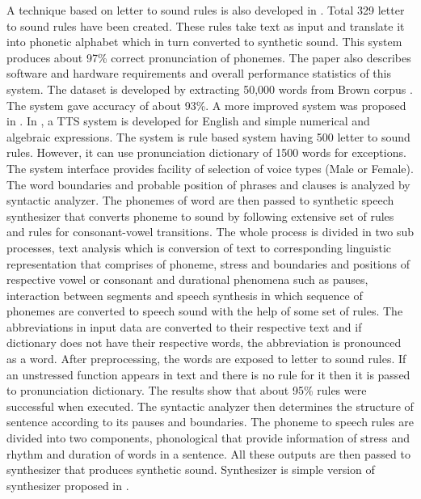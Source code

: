 A technique based on letter to sound rules is also developed in \cite{elovitz1976automatic}. Total 329 letter to sound rules have been created. These rules take text as input and translate it into phonetic alphabet which in turn converted to synthetic sound. This system produces about 97\% correct pronunciation of phonemes. The paper also describes software and hardware requirements and overall performance statistics of this system. The dataset is developed by extracting 50,000 words from Brown corpus \cite{ku1967computational}. The system gave accuracy of about 93\%. A more improved system was proposed in \cite{carlson1982multi, klatt1982klattalk}. In \cite{klatt1982klattalk}, a TTS system is developed for English and simple numerical and algebraic expressions. The system is rule based system having 500 letter to sound rules. However, it can use pronunciation dictionary of 1500 words for exceptions. The system interface provides facility of selection of voice types (Male or Female). The word boundaries and probable position of phrases and clauses is analyzed by syntactic analyzer. The phonemes of word are then passed to synthetic speech synthesizer that converts phoneme to sound by following extensive set of rules and rules for consonant-vowel transitions. The whole process is divided in two sub processes, text analysis which is conversion of text to corresponding linguistic representation that comprises of phoneme, stress and boundaries and positions of respective vowel or consonant and durational phenomena such as pauses, interaction between segments \cite{klatt1979synthesis} and speech synthesis in which sequence of phonemes are converted to speech sound with the help of some set of rules. The abbreviations in input data are converted to their respective text and if dictionary does not have their respective words, the abbreviation is pronounced as a word. After preprocessing, the words are exposed to letter to sound rules. If an unstressed function appears in text and there is no rule for it then it is passed to pronunciation dictionary. The results show that about 95\% rules were successful when executed. The syntactic analyzer then determines the structure of sentence according to its pauses and boundaries. The phoneme to speech rules are divided into two components, phonological that provide information of stress and rhythm and duration of words in a sentence. All these outputs are then passed to synthesizer that produces synthetic sound. Synthesizer is simple version of synthesizer proposed in \cite{klatt1980software}.

